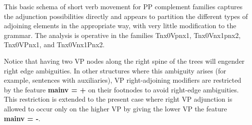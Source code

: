 This basic schema of short verb movement for PP complement families
captures the adjunction possibilities directly and appears to partition
the different types of adjoining elements in the appropriate way, with
very little modification to the grammar. The analysis is operative
in the families Tnx0Vpnx1, Tnx0Vnx1pnx2, Tnx0VPnx1, and Tnx0Vnx1Pnx2.

Notice that having two VP nodes along the right spine of the trees will
engender right edge ambiguities. In other structures where this ambiguity
arises (for example, sentences with auxiliaries), VP right-adjoining modifiers
are restricted by the feature {\bf mainv = +} on their footnodes to avoid
right-edge ambiguities. This restriction is extended to the present case where
right VP adjunction is allowed to occur only on the higher VP by giving the
lower VP the feature {\bf mainv = -}.


